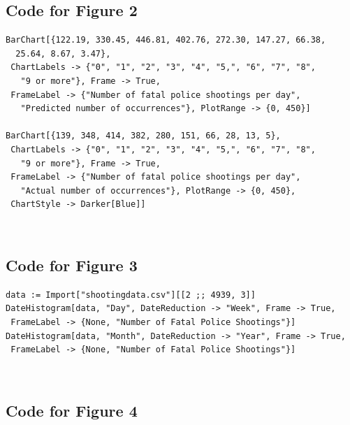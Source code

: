\documentclass[a4paper]{article}
\begin{document}
	\subsection{Code for Figure 2}
\begin{lstlisting}
BarChart[{122.19, 330.45, 446.81, 402.76, 272.30, 147.27, 66.38, 
  25.64, 8.67, 3.47}, 
 ChartLabels -> {"0", "1", "2", "3", "4", "5,", "6", "7", "8", 
   "9 or more"}, Frame -> True, 
 FrameLabel -> {"Number of fatal police shootings per day", 
   "Predicted number of occurrences"}, PlotRange -> {0, 450}]

BarChart[{139, 348, 414, 382, 280, 151, 66, 28, 13, 5}, 
 ChartLabels -> {"0", "1", "2", "3", "4", "5,", "6", "7", "8", 
   "9 or more"}, Frame -> True, 
 FrameLabel -> {"Number of fatal police shootings per day", 
   "Actual number of occurrences"}, PlotRange -> {0, 450}, 
 ChartStyle -> Darker[Blue]]
\end{lstlisting}
\

	\subsection{Code for Figure 3}
\begin{lstlisting}
data := Import["shootingdata.csv"][[2 ;; 4939, 3]]
DateHistogram[data, "Day", DateReduction -> "Week", Frame -> True, 
 FrameLabel -> {None, "Number of Fatal Police Shootings"}]
DateHistogram[data, "Month", DateReduction -> "Year", Frame -> True, 
 FrameLabel -> {None, "Number of Fatal Police Shootings"}]
\end{lstlisting}
\

	\subsection{Code for Figure 4}
\end{document}
